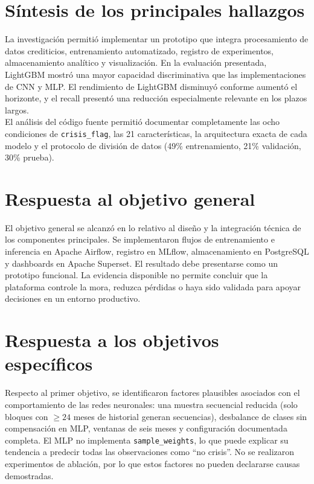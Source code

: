 \section{Síntesis de los principales hallazgos}

La investigación permitió implementar un prototipo que integra procesamiento de datos crediticios, entrenamiento automatizado, registro de experimentos, almacenamiento analítico y visualización. En la evaluación presentada, LightGBM mostró una mayor capacidad discriminativa que las implementaciones de CNN y MLP. El rendimiento de LightGBM disminuyó conforme aumentó el horizonte, y el recall presentó una reducción especialmente relevante en los plazos largos.\\

El análisis del código fuente permitió documentar completamente las ocho condiciones de \texttt{crisis\_flag}, las 21 características, la arquitectura exacta de cada modelo y el protocolo de división de datos (49\% entrenamiento, 21\% validación, 30\% prueba).

\section{Respuesta al objetivo general}

El objetivo general se alcanzó en lo relativo al diseño y la integración técnica de los componentes principales. Se implementaron flujos de entrenamiento e inferencia en Apache Airflow, registro en MLflow, almacenamiento en PostgreSQL y dashboards en Apache Superset. El resultado debe presentarse como un prototipo funcional. La evidencia disponible no permite concluir que la plataforma controle la mora, reduzca pérdidas o haya sido validada para apoyar decisiones en un entorno productivo.

\section{Respuesta a los objetivos específicos}

Respecto al primer objetivo, se identificaron factores plausibles asociados con el comportamiento de las redes neuronales: una muestra secuencial reducida (solo bloques con $\geq 24$ meses de historial generan secuencias), desbalance de clases sin compensación en MLP, ventanas de seis meses y configuración documentada completa. El MLP no implementa \texttt{sample\_weights}, lo que puede explicar su tendencia a predecir todas las observaciones como ``no crisis''. No se realizaron experimentos de ablación, por lo que estos factores no pueden declararse causas demostradas.\\

